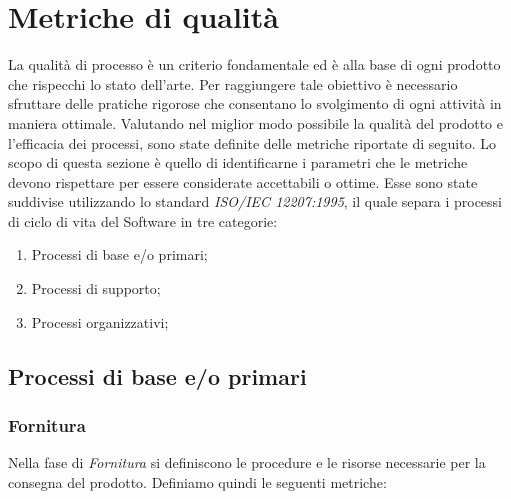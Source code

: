 \section{Metriche di qualità}
La qualità di processo è un criterio fondamentale ed è alla base di ogni prodotto che rispecchi lo stato dell'arte.
Per raggiungere tale obiettivo è necessario sfruttare delle pratiche rigorose che consentano lo svolgimento di ogni attività in maniera ottimale.
Valutando nel miglior modo possibile la qualità del prodotto e l'efficacia dei processi, sono state definite delle metriche riportate di seguito.
Lo scopo di questa sezione è quello di identificarne i parametri che le metriche devono rispettare per essere considerate accettabili o ottime. Esse sono state suddivise utilizzando lo standard \emph{ISO/IEC 12207:1995},
il quale separa i processi di ciclo di vita del Software in tre categorie:
\begin{enumerate}
    \item Processi di base e/o primari;
    \item Processi di supporto;
    \item Processi organizzativi;
\end{enumerate}

\subsection{Processi di base e/o primari}
\subsubsection{Fornitura}
Nella fase di \emph{Fornitura} si definiscono le procedure e le risorse necessarie per la consegna del prodotto.
Definiamo quindi le seguenti metriche:


